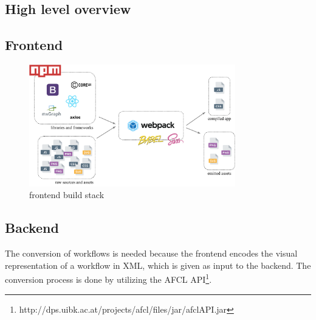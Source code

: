 \documentclass[a4paper,12pt,pdftex,halfparskip,cleardoubleempty,bibtotoc,liststotoc]{scrbook}
\begin{document}
\subsection{High level overview}



\subsection{Frontend}

\begin{figure}[htbp]
  \centering
  \vspace{0.8cm}
  \includegraphics[width=0.8\textwidth]{frontend-setup}
  \caption{frontend build stack}
\end{figure}

\subsection{Backend}

The conversion of workflows is needed because the frontend encodes the visual representation of a workflow in XML, which is given as input to the backend. The conversion process is done by utilizing the AFCL API\footnote{http://dps.uibk.ac.at/projects/afcl/files/jar/afclAPI.jar}. 



\end{document}

